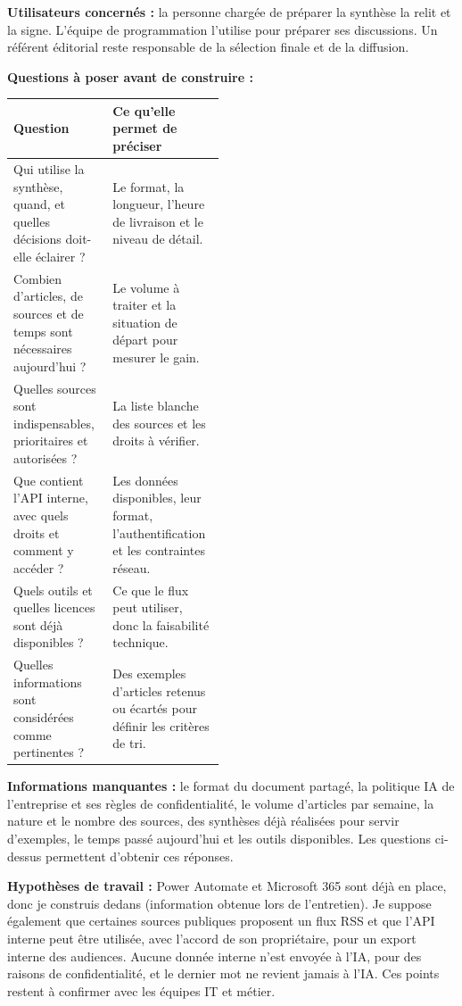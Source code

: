 \documentclass[10pt,a4paper]{article}
\newcommand{\cadre}[1]{\textbf{\color{ardoise}#1 :}}
\newcommand{\humain}[1]{\textbf{\color{amber!85!black}#1 :}}
\newcommand{\verif}[1]{\textbf{\color{brique}#1 :}}
\begin{document}
\humain{Utilisateurs concernés} la personne chargée de préparer la synthèse la relit et la signe. L’équipe de programmation l’utilise pour préparer ses discussions. Un référent éditorial reste responsable de la sélection finale et de la diffusion.

\cadre{Questions à poser avant de construire}\par\vspace{1pt}
{\small
\begin{tabularx}{\linewidth}{>{\raggedright\arraybackslash}p{0.47\linewidth}L}
\toprule
\textbf{Question} & \textbf{Ce qu’elle permet de préciser}\\
\midrule
Qui utilise la synthèse, quand, et quelles décisions doit-elle éclairer ? & Le format, la longueur, l’heure de livraison et le niveau de détail.\\
Combien d’articles, de sources et de temps sont nécessaires aujourd’hui ? & Le volume à traiter et la situation de départ pour mesurer le gain.\\
Quelles sources sont indispensables, prioritaires et autorisées ? & La liste blanche des sources et les droits à vérifier.\\
Que contient l’API interne, avec quels droits et comment y accéder ? & Les données disponibles, leur format, l’authentification et les contraintes réseau.\\
Quels outils et quelles licences sont déjà disponibles ? & Ce que le flux peut utiliser, donc la faisabilité technique.\\
Quelles informations sont considérées comme pertinentes ? & Des exemples d’articles retenus ou écartés pour définir les critères de tri.\\
\bottomrule
\end{tabularx}}


\verif{Informations manquantes} le format du document partagé, la politique IA de l’entreprise et ses règles de confidentialité, le volume d’articles par semaine, la nature et le nombre des sources, des synthèses déjà réalisées pour servir d’exemples, le temps passé aujourd’hui et les outils disponibles. Les questions ci-dessus permettent d’obtenir ces réponses.

\verif{Hypothèses de travail} Power Automate et Microsoft 365 sont déjà en place, donc je construis dedans (information obtenue lors de l’entretien). Je suppose également que certaines sources publiques proposent un flux RSS et que l’API interne peut être utilisée, avec l’accord de son propriétaire, pour un export interne des audiences. Aucune donnée interne n’est envoyée à l’IA, pour des raisons de confidentialité, et le dernier mot ne revient jamais à l’IA. Ces points restent à confirmer avec les équipes IT et métier.
\end{document}
